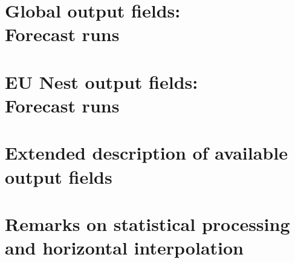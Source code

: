 \documentclass[a4paper,twoside,10pt]{book}
\begin{document}






\chapter[Global output fields: Forecast runs]{Global output fields:\\ Forecast runs}



\chapter[EU Nest output fields: Forecast runs]{EU Nest output fields:\\ Forecast runs}




\chapter{Extended description of available output fields}




\chapter[Remarks on statistical processing and horizontal interpolation]{Remarks on statistical processing and horizontal interpolation}


\end{document}
